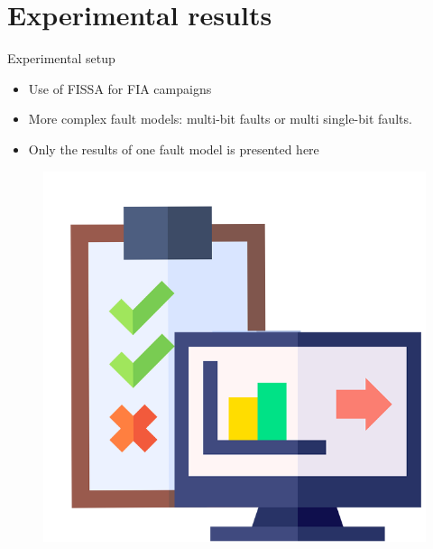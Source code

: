 \section{Experimental results}

\begin{frame}{Experimental setup}
    \begin{minipage}[c]{0.7\linewidth}
        \begin{block}{}
            \begin{itemize}
                \item Use of FISSA for FIA campaigns
                \item More complex fault models: multi-bit faults or multi single-bit faults.
                \item Only the results of one fault model is presented here
            \end{itemize}
        \end{block}
    \end{minipage}\hfill%
    \begin{minipage}[c]{0.3\linewidth}
        \begin{figure}
            \centering
            \includegraphics[width=.75\textwidth]{src/5_results/img/experimental.png}
        \end{figure}
    \end{minipage}
\end{frame}
